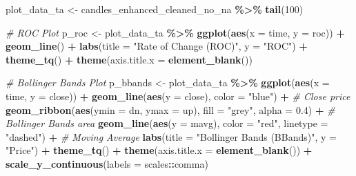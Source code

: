 \documentclass[
]{article}
\newenvironment{Shaded}{\begin{snugshade}}{\end{snugshade}}
\newcommand{\AttributeTok}[1]{\textcolor[rgb]{0.13,0.29,0.53}{#1}}
\newcommand{\CommentTok}[1]{\textcolor[rgb]{0.56,0.35,0.01}{\textit{#1}}}
\newcommand{\DecValTok}[1]{\textcolor[rgb]{0.00,0.00,0.81}{#1}}
\newcommand{\FloatTok}[1]{\textcolor[rgb]{0.00,0.00,0.81}{#1}}
\newcommand{\FunctionTok}[1]{\textcolor[rgb]{0.13,0.29,0.53}{\textbf{#1}}}
\newcommand{\NormalTok}[1]{#1}
\newcommand{\OtherTok}[1]{\textcolor[rgb]{0.56,0.35,0.01}{#1}}
\newcommand{\SpecialCharTok}[1]{\textcolor[rgb]{0.81,0.36,0.00}{\textbf{#1}}}
\newcommand{\StringTok}[1]{\textcolor[rgb]{0.31,0.60,0.02}{#1}}
\begin{document}
\begin{Shaded}
\begin{Highlighting}[]
\NormalTok{plot\_data\_ta }\OtherTok{\textless{}{-}}\NormalTok{ candles\_enhanced\_cleaned\_no\_na }\SpecialCharTok{\%\textgreater{}\%} \FunctionTok{tail}\NormalTok{(}\DecValTok{100}\NormalTok{)}

\CommentTok{\# ROC Plot}
\NormalTok{p\_roc }\OtherTok{\textless{}{-}}\NormalTok{ plot\_data\_ta }\SpecialCharTok{\%\textgreater{}\%}
  \FunctionTok{ggplot}\NormalTok{(}\FunctionTok{aes}\NormalTok{(}\AttributeTok{x =}\NormalTok{ time, }\AttributeTok{y =}\NormalTok{ roc)) }\SpecialCharTok{+}
  \FunctionTok{geom\_line}\NormalTok{() }\SpecialCharTok{+}
  \FunctionTok{labs}\NormalTok{(}\AttributeTok{title =} \StringTok{"Rate of Change (ROC)"}\NormalTok{, }\AttributeTok{y =} \StringTok{"ROC"}\NormalTok{) }\SpecialCharTok{+}
  \FunctionTok{theme\_tq}\NormalTok{() }\SpecialCharTok{+}
  \FunctionTok{theme}\NormalTok{(}\AttributeTok{axis.title.x =} \FunctionTok{element\_blank}\NormalTok{())}

\CommentTok{\# Bollinger Bands Plot}
\NormalTok{p\_bbands }\OtherTok{\textless{}{-}}\NormalTok{ plot\_data\_ta }\SpecialCharTok{\%\textgreater{}\%}
  \FunctionTok{ggplot}\NormalTok{(}\FunctionTok{aes}\NormalTok{(}\AttributeTok{x =}\NormalTok{ time, }\AttributeTok{y =}\NormalTok{ close)) }\SpecialCharTok{+}
  \FunctionTok{geom\_line}\NormalTok{(}\FunctionTok{aes}\NormalTok{(}\AttributeTok{y =}\NormalTok{ close), }\AttributeTok{color =} \StringTok{"blue"}\NormalTok{) }\SpecialCharTok{+} \CommentTok{\# Close price}
  \FunctionTok{geom\_ribbon}\NormalTok{(}\FunctionTok{aes}\NormalTok{(}\AttributeTok{ymin =}\NormalTok{ dn, }\AttributeTok{ymax =}\NormalTok{ up), }\AttributeTok{fill =} \StringTok{"grey"}\NormalTok{, }\AttributeTok{alpha =} \FloatTok{0.4}\NormalTok{) }\SpecialCharTok{+} \CommentTok{\# Bollinger Bands area}
  \FunctionTok{geom\_line}\NormalTok{(}\FunctionTok{aes}\NormalTok{(}\AttributeTok{y =}\NormalTok{ mavg), }\AttributeTok{color =} \StringTok{"red"}\NormalTok{, }\AttributeTok{linetype =} \StringTok{"dashed"}\NormalTok{) }\SpecialCharTok{+} \CommentTok{\# Moving Average}
  \FunctionTok{labs}\NormalTok{(}\AttributeTok{title =} \StringTok{"Bollinger Bands (BBands)"}\NormalTok{, }\AttributeTok{y =} \StringTok{"Price"}\NormalTok{) }\SpecialCharTok{+}
  \FunctionTok{theme\_tq}\NormalTok{() }\SpecialCharTok{+}
  \FunctionTok{theme}\NormalTok{(}\AttributeTok{axis.title.x =} \FunctionTok{element\_blank}\NormalTok{()) }\SpecialCharTok{+}
  \FunctionTok{scale\_y\_continuous}\NormalTok{(}\AttributeTok{labels =}\NormalTok{ scales}\SpecialCharTok{::}\NormalTok{comma)}


\end{Highlighting}
\end{Shaded}
\end{document}
